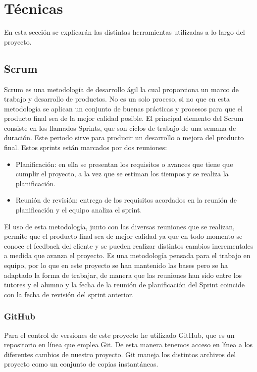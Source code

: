 


\section{Técnicas}
En esta sección se explicarán las distintas herramientas utilizadas a lo largo del proyecto.

\subsection{Scrum}
Scrum es una metodología de desarrollo ágil la cual proporciona un marco de trabajo y desarrollo de productos. No es un solo proceso, si no que en esta metodología se aplican un conjunto de buenas prácticas y procesos para que el producto final sea de la mejor calidad posible.
El principal elemento del Scrum consiste en los llamados Sprints, que son ciclos de trabajo de una semana de duración. Este periodo sirve para producir un desarrollo o mejora del producto final. Estos sprints están marcados por dos reuniones:
\begin{itemize}
	\item Planificación: en ella se presentan los requisitos o avances que tiene que cumplir el proyecto, a la vez que se estiman los tiempos y se realiza la planificación.
	\item Reunión de revisión: entrega de los requisitos acordados en la reunión de planificación y el equipo analiza el sprint.
\end{itemize}
El uso de esta metodología, junto con las diversas reuniones que se realizan, permite que el producto final sea de mejor calidad ya que en todo momento se conoce el feedback del cliente y se pueden realizar distintos cambios incrementales a medida que avanza el proyecto.
Es una metodología pensada para el trabajo en equipo, por lo que en este proyecto se han mantenido las bases pero se ha adaptado la forma de trabajar, de manera que las reuniones han sido entre los tutores y el alumno y la fecha de la reunión de planificación del Sprint coincide con la fecha de revisión del sprint anterior.


\subsubsection{GitHub}
Para el control de versiones de este proyecto he utilizado GitHub, que es un repositorio en línea que emplea Git. De esta manera tenemos acceso en línea a los diferentes cambios de nuestro proyecto.
Git maneja los distintos archivos del proyecto como un conjunto de copias instantáneas. 


